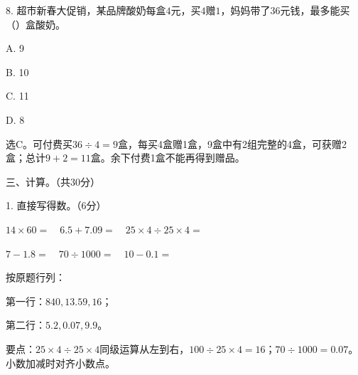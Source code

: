 8. 超市新春大促销，某品牌酸奶每盒\(4\)元，买\(4\)赠\(1\)，妈妈带了\(36\)元钱，最多能买（\hspace{1.8em}）盒酸奶。\par
\noindent A. 9\par
\noindent B. 10\par
\noindent C. 11\par
\noindent D. 8\par
\begin{BookAnswer}
选C。可付费买\(36\div4=9\)盒，每买4盒赠1盒，9盒中有2组完整的4盒，可获赠2盒；总计\(9+2=11\)盒。余下付费1盒不能再得到赠品。
\end{BookAnswer}

三、计算。（共30分）\par 1. 直接写得数。（6分）\par \(14\times60=\quad6.5+7.09=\quad25\times4\div25\times4=\)\par \(7-1.8=\quad70\div1000=\quad10-0.1=\)\par
\begin{BookAnswer}
按原题行列：\par 第一行：\(840,13.59,16\)；\par 第二行：\(5.2,0.07,9.9\)。\par 要点：\(25\times4\div25\times4\)同级运算从左到右，\allowbreak{}\(100\div25\times4=16\)；\allowbreak{}\(70\div1000=0.07\)。小数加减时对齐小数点。
\end{BookAnswer}

